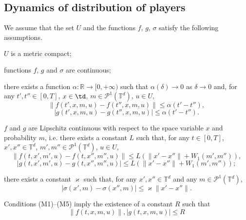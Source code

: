\documentclass[a4paper,12pt]{article}
\newcommand{\ptd}{\mathcal{P}^1(\mathbb{T}^d)}
\begin{document}
\subsection{Dynamics of distribution of players}\label{subsect:dynamics}
We assume that the set $U$ and the functions $f$, $g$, $\sigma$ satisfy the following assumptions.
\begin{list}{(M)}{}
	\item $U$ is a metric compact;
	\item functions $f$, $g$ and $\sigma$ are continuous;
	\item\label{cond:alpha_cont} there exists a function $\alpha:\mathbb{R}\rightarrow [0,+\infty)$ such that $\alpha(\delta)\rightarrow 0$ as $\delta\rightarrow 0$ and, for any $t',t''\in [0,T]$, $x\in\td$, $m\in\ptd$, $u\in U$, $$\|f(t',x,m,u)-f(t'',x,m,u)\|\leq\alpha(t'-t''),$$
	$$|g(t',x,m,u)-g(t'',x,m,u)|\leq\alpha(t'-t'').$$
	\item\label{cond:lipschitz} $f$ and $g$ are Lipschitz continuous with respect to the space variable $x$ and probability $m$, i.e. there exists a constant $L$ such that, for any $t\in [0,T]$, $x',x''\in \mathbb{T}^d$, $m',m''\in\ptd$, $u\in U$,
	$$\|f(t,x',m',u)-f(t,x'',m'',u)\|\leq L(\|x'-x''\|+W_1(m',m'')), $$
	$$|g(t,x',m',u)-g(t,x'',m'',u)|\leq L(\|x'-x''\|+W_1(m',m''));$$
	\item\label{cond:lip+sigma} there exists a constant $\varkappa$ such that, for any $x',x''\in\mathbb{T}^d$ and any $m\in\ptd$,
	$$|\sigma(x',m)-\sigma(x'',m)|\leq \varkappa\|x'-x''\|. $$
	
\end{list}

Conditions (M1)--(M5) imply the existence of a constant $R$ such that
\begin{equation}\label{intro:R}
\|f(t,x,m,u)\|,|g(t,x,m,u)|\leq R
\end{equation}
\end{document}
